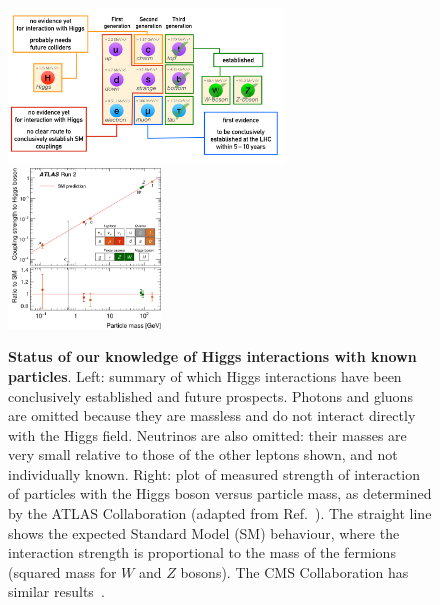 \documentclass[12pt]{article}
\begin{document}
\begin{figure}
  \phantom{x}\hspace{-0.5cm}
  \includegraphics[width=0.65\textwidth]{figs/Fig4a.pdf}%
  \includegraphics[width=0.36\textwidth]{figs/ATLASfig6-crop.pdf}    
  \caption{{\bf Status of our knowledge of Higgs interactions with
      known particles}. Left: summary of which Higgs interactions have
    been conclusively established and future prospects.  Photons and
    gluons are omitted because they are massless and do not interact
    directly with the Higgs field. Neutrinos are also omitted: their
    masses are very small relative to those of the other leptons
    shown, and not individually known.
    Right: plot of measured strength of
    interaction of particles with the Higgs boson versus particle
    mass, as determined by the ATLAS Collaboration (adapted from
    Ref.~\cite{ATLASNature}). 
    The straight line shows the expected Standard Model (SM) behaviour,
    where the interaction strength is proportional to the mass of
    the fermions (squared mass for $W$ and $Z$ bosons).
    The CMS Collaboration has similar results~\cite{CMSNature}.
  } 
  \label{fig:interactions}
\end{figure}
\end{document}
